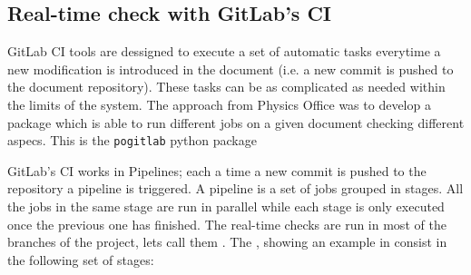 \subsection{Real-time check with GitLab's CI}
GitLab CI tools are dessigned to execute a set of automatic tasks everytime a new modification is introduced in the document (i.e. a new commit is pushed to the document repository). These tasks can be as complicated as needed within the limits of the system. The approach from Physics Office was to develop a package which is able to run different jobs on a given document checking different aspecs. This is the \texttt{pogitlab} python package~\cite{pogitlab-repo}

GitLab's CI works in Pipelines; each a time a new commit is pushed to the repository a pipeline is triggered. A pipeline is a set of jobs grouped in stages. All the jobs in the same stage are run in parallel while each stage is only executed once the previous one has finished. The real-time checks are run in most of the branches of the project, lets call them \epipes. The \epipes, showing an example in \Fig{\ref{fig:edit-pipe}} consist in the following set of stages:

